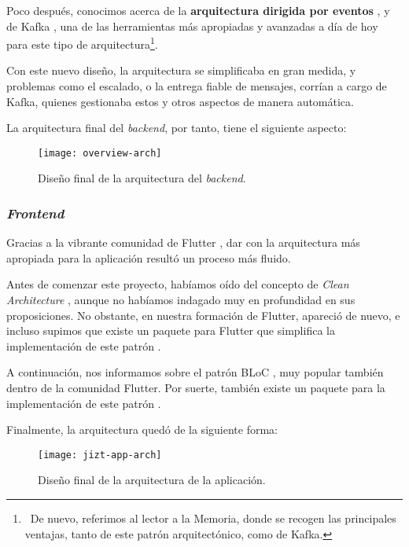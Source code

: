 Poco después, conocimos acerca de la \textbf{arquitectura dirigida por eventos} \cite{event-driven}, y de Kafka \cite{apache-kafka}, una de las herramientas más apropiadas y avanzadas a día de hoy para este tipo de arquitectura\footnote{\, De nuevo, referimos al lector a la Memoria, donde se recogen las principales ventajas, tanto de este patrón arquitectónico, como de Kafka.}.

Con este nuevo diseño, la arquitectura se simplificaba en gran medida, y problemas como el escalado, o la entrega fiable de mensajes, corrían a cargo de Kafka, quienes gestionaba estos y otros aspectos de manera automática.

La arquitectura final del \emph{backend}, por tanto, tiene el siguiente aspecto:

\begin{figure}[h]
	\centering
	\texttt{[image: overview-arch]}
	\vspace{-0.5cm}
	\caption{Diseño final de la arquitectura del \emph{backend}.}
\end{figure}



\subsubsection{\Large \emph{Frontend}}

Gracias a la vibrante comunidad de Flutter \cite{flutter-es}, dar con la arquitectura más apropiada para la aplicación resultó un proceso más fluido.

Antes de comenzar este proyecto, habíamos oído del concepto de \emph{Clean Architecture} \cite{martin15}, aunque no habíamos indagado muy en profundidad en sus proposiciones. No obstante, en nuestra formación de Flutter, apareció de nuevo, e incluso supimos que existe un paquete para Flutter que simplifica la implementación de este patrón \cite{flutter-clean-arch}.

A continuación, nos informamos sobre el patrón BLoC \cite{bloc-pattern}, muy popular también dentro de la comunidad Flutter. Por suerte, también existe un paquete para la implementación de este patrón \cite{bloc-package}.

Finalmente, la arquitectura quedó de la siguiente forma:

\begin{figure}[h]
	\centering
	\texttt{[image: jizt-app-arch]}
	\vspace{-0.5cm}
	\caption{Diseño final de la arquitectura de la aplicación.}
\end{figure}

